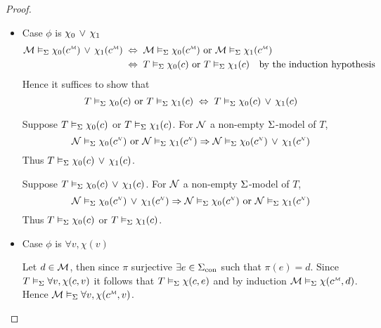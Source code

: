 \begin{proof}
\begin{itemize}
        \item Case $\phi$ is $\chi_0 \, \lor \, \chi_1$
            \begin{align*}
                \MM \model{\Si} \chi_0(\mmintp{c}) \OR \chi_1(\mmintp{c}) 
                    &\;\iff\; \MM \model{\Si} \chi_0(\mmintp{c}) 
                    \text{ or } \MM \model{\Si} \chi_1(\mmintp{c}) \\
                    &\;\iff\; T \model{\Si} \chi_0(c) \text{ or } 
                    T \model{\Si} \chi_1(c) 
                    \text{\quad by the induction hypothesis}
            \end{align*}
            Hence it suffices to show that 
            \[T \vDash_{\Sigma} \chi_0(c) \text{ or } T \vDash_{\Sigma} \chi_1(c) 
            \;\Leftrightarrow\; T \vDash_{\Sigma} \chi_0(c) \, \lor \, \chi_1(c)\]
            \begin{forward}
                Suppose $T \vDash_{\Sigma} \chi_0(c)$ or 
                $T \vDash_{\Sigma} \chi_1(c)$.
                For $\mathcal{N}$ a non-empty $\Sigma$-model of $T$,
                \[
                    \NN \model{\Si} \chi_0(\nnintp{c}) \text{ or } 
                    \NN \model{\Si} \chi_1(\nnintp{c}) 
                    \implies \NN \model{\Si} \chi_0(\nnintp{c}) 
                    \OR \chi_1(\nnintp{c})
                \]
                Thus $T \vDash_{\Sigma} \chi_0(c) \, \lor \, \chi_1(c)$.
            \end{forward}

            \begin{backward}
                Suppose $T \vDash_{\Sigma} \chi_0(c) \, \lor \, \chi_1(c)$.
                For $\mathcal{N}$ a non-empty $\Sigma$-model of $T$,
                \[
                    \NN \model{\Si} \chi_0(\nnintp{c}) 
                    \OR \chi_1(\nnintp{c}) 
                    \implies
                    \NN \model{\Si} \chi_0(\nnintp{c}) \text{ or } 
                    \NN \model{\Si} \chi_1(\nnintp{c}) 
                \]
                Thus $T \vDash_{\Sigma} \chi_0(c)$ or $T \vDash_{\Sigma} \chi_1(c)$.
            \end{backward}

        \item Case $\phi$ is $\forall v, \chi(v)$
            \begin{forward}
                Let $d \in {\mathcal{M}}$, 
                then since $\pi$ surjective $\exists e \in {\Sigma}_\mathrm{con}$
                such that $\pi(e) = d$.
                Since $T \vDash_{\Sigma} \forall v, \chi(c,v)$ 
                it follows that $T \vDash_{\Sigma} \chi(c,e)$
                and by induction $\MM \model{\Si} \chi(\mmintp{c},d)$.
                Hence $\MM \model{\Si} \forall v, \chi(\mmintp{c},v)$.
            \end{forward}


\end{itemize}
\end{proof}
